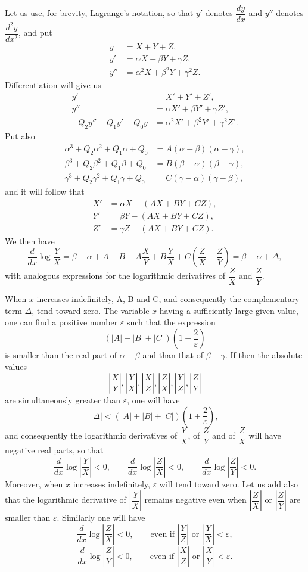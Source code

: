 \documentclass[11pt]{article}
\begin{document}
Let us use, for brevity, Lagrange's notation, so that $y'$ denotes $\dfrac{dy}{dx}$ and $y''$ denotes $\dfrac{d^2y}{dx^2}$, and put
\[
\begin{aligned}
y&=X+Y+Z,\\
y'&=\alpha X+\beta Y+\gamma Z,\\
y''&=\alpha^2X+\beta^2Y+\gamma^2Z.
\end{aligned}
\]
Differentiation will give us
\[
\begin{aligned}
y'&=X'+Y'+Z',\\
y''&=\alpha X'+\beta Y'+\gamma Z',\\
-Q_2y''-Q_1y'-Q_0y&=\alpha^2X'+\beta^2Y'+\gamma^2Z'.
\end{aligned}
\]
Put also
\[
\begin{aligned}
\alpha^3+Q_2\alpha^2+Q_1\alpha+Q_0&=A(\alpha-\beta)(\alpha-\gamma),\\
\beta^3+Q_2\beta^2+Q_1\beta+Q_0&=B(\beta-\alpha)(\beta-\gamma),\\
\gamma^3+Q_2\gamma^2+Q_1\gamma+Q_0&=C(\gamma-\alpha)(\gamma-\beta),
\end{aligned}
\]
and it will follow that
\[
\begin{aligned}
X'&=\alpha X-(AX+BY+CZ),\\
Y'&=\beta Y-(AX+BY+CZ),\\
Z'&=\gamma Z-(AX+BY+CZ).
\end{aligned}
\]
We then have
\[
\frac{d}{dx}\log\frac{Y}{X}
=\beta-\alpha+A-B-A\frac{X}{Y}+B\frac{Y}{X}+C\left(\frac{Z}{X}-\frac{Z}{Y}\right)
=\beta-\alpha+\Delta,
\]
with analogous expressions for the logarithmic derivatives of $\dfrac{Z}{X}$ and $\dfrac{Z}{Y}$.

When $x$ increases indefinitely, A, B and C, and consequently the complementary term $\Delta$, tend toward zero. The variable $x$ having a sufficiently large given value, one can find a positive number $\varepsilon$ such that the expression
\[
(|A|+|B|+|C|)\left(1+\frac2\varepsilon\right)
\]
is smaller than the real part of $\alpha-\beta$ and than that of $\beta-\gamma$. If then the absolute values
\[
\left|\frac{X}{Y}\right|,
\left|\frac{Y}{X}\right|,
\left|\frac{X}{Z}\right|,
\left|\frac{Z}{X}\right|,
\left|\frac{Y}{Z}\right|,
\left|\frac{Z}{Y}\right|
\]
are simultaneously greater than $\varepsilon$, one will have
\[
|\Delta|<(|A|+|B|+|C|)\left(1+\frac2\varepsilon\right),
\]
and consequently the logarithmic derivatives of $\dfrac{Y}{X}$, of $\dfrac{Z}{Y}$ and of $\dfrac{Z}{X}$ will have negative real parts, so that
\[
\frac{d}{dx}\log\left|\frac{Y}{X}\right|<0,
\qquad
\frac{d}{dx}\log\left|\frac{Z}{X}\right|<0,
\qquad
\frac{d}{dx}\log\left|\frac{Z}{Y}\right|<0.
\]
Moreover, when $x$ increases indefinitely, $\varepsilon$ will tend toward zero. Let us add also that the logarithmic derivative of $\left|\dfrac{Y}{X}\right|$ remains negative even when $\left|\dfrac{Z}{X}\right|$ or $\left|\dfrac{Z}{Y}\right|$ are smaller than $\varepsilon$. Similarly one will have
\[
\frac{d}{dx}\log\left|\frac{Z}{X}\right|<0,
\qquad\text{even if }\left|\frac{Y}{Z}\right|\text{ or }\left|\frac{Y}{X}\right|<\varepsilon,
\]
\[
\frac{d}{dx}\log\left|\frac{Z}{Y}\right|<0,
\qquad\text{even if }\left|\frac{X}{Z}\right|\text{ or }\left|\frac{X}{Y}\right|<\varepsilon.
\]
\end{document}
